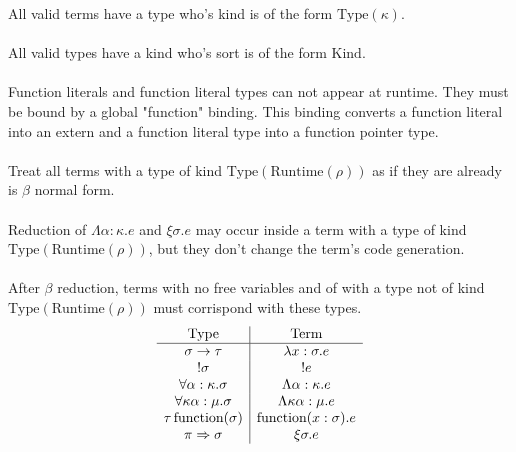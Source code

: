 \documentclass {article}
\begin{document}
All valid terms have a type who's kind is of the form $ \text{Type} (\kappa) $. \\
\\
All valid types have a kind who's sort is of the form $ \text{Kind} $.\\
\\
Function literals and function literal types can not appear at runtime. They must be bound by a global "function" binding.
This binding converts a function literal into an extern and a function literal type into a function pointer type. \\
\\
Treat all terms with a type of kind $ \text{Type} (\text{Runtime} (\rho)) $ as if they are already is $ \beta $ normal form. \\
\\
Reduction of $ \Lambda \alpha : \kappa. e $ and $ \xi \sigma. e $ may occur inside a term with a type of kind $ \text{Type} (\text{Runtime} (\rho)) $, but they don't
change the term's code generation. \\
\\
After $ \beta $ reduction, terms with no free variables and of with a type not of kind $ \text{Type} (\text{Runtime} (\rho) ) $ must corrispond with these types. \\
\begin{gather*}
\begin{array}{c | c}
\text{Type} & \text{Term} \\
\hline
\sigma \to \tau & \lambda x : \sigma. e \\
!\sigma & !e \\
\forall \alpha : \kappa. \sigma & \Lambda \alpha : \kappa. e  \\
\forall \kappa \alpha : \mu. \sigma & \Lambda \kappa \alpha : \mu. e \\
\tau \, \text{function} (\sigma) & \text{function}(x : \sigma). e \\
\pi \Rightarrow \sigma & \xi \sigma. e
\end{array}
\end{gather*}
\end{document}
